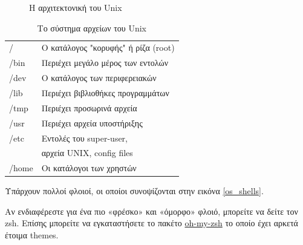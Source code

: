 \begin{figure}[h]
\centering
{}
\caption{Η αρχιτεκτονική του Unix \cite{Stevens:2013}}
\end{figure} 


\begin{center}
\begin{table}[h]
\begin{tabular}{ l | l }
  / & Ο κατάλογος "κορυφής" ή ρίζα (root)  \\
  /bin & Περιέχει μεγάλο μέρος των εντολών  \\
  /dev & Ο κατάλογος των περιφερειακών  \\
  /lib & Περιέχει βιβλιοθήκες προγραμμάτων \\
  /tmp & Περιέχει προσωρινά αρχεία \\
  /usr & Περιέχει αρχεία υποστήριξης \\
  /etc & Εντολές του super-user, \\
      &	αρχεία UNIX, config files \\
  /home& Οι κατάλογοι των χρηστών \\
\end{tabular}  
\caption{Το σύστημα αρχείων του Unix}
\end{table}

\end{center}

Υπάρχουν πολλοί φλοιοί, οι οποίοι συνοψίζονται στην εικόνα \ref{os_shells}.


\begin{tcolorbox}[frogbox, title=zsh]
	Αν ενδιαφέρεστε για ένα πιο «φρέσκο» και «όμορφο» φλοιό, μπορείτε να δείτε τον zsh. Επίσης μπορείτε να εγκαταστήσετε το πακέτο \href{https://github.com/robbyrussell/oh-my-zsh}{oh-my-zsh} το οποίο έχει αρκετά έτοιμα themes.
\end{tcolorbox}


